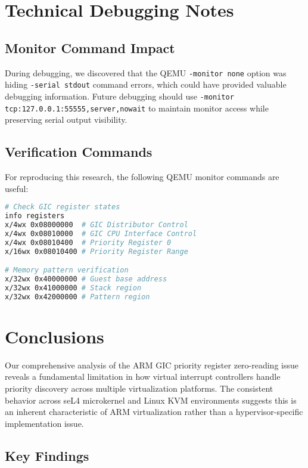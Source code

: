 \documentclass[12pt,a4paper]{article}
\begin{document}
\section{Technical Debugging Notes}

\subsection{Monitor Command Impact}

During debugging, we discovered that the QEMU \texttt{-monitor none} option was hiding \texttt{-serial stdout} command errors, which could have provided valuable debugging information. Future debugging should use \texttt{-monitor tcp:127.0.0.1:55555,server,nowait} to maintain monitor access while preserving serial output visibility.

\subsection{Verification Commands}

For reproducing this research, the following QEMU monitor commands are useful:

\begin{lstlisting}[language=bash,caption={QEMU Monitor Commands for GIC Analysis}]
# Check GIC register states
info registers
x/4wx 0x08000000  # GIC Distributor Control
x/4wx 0x08010000  # GIC CPU Interface Control  
x/4wx 0x08010400  # Priority Register 0
x/16wx 0x08010400 # Priority Register Range

# Memory pattern verification
x/32wx 0x40000000 # Guest base address
x/32wx 0x41000000 # Stack region
x/32wx 0x42000000 # Pattern region
\end{lstlisting}

\section{Conclusions}

Our comprehensive analysis of the ARM GIC priority register zero-reading issue reveals a fundamental limitation in how virtual interrupt controllers handle priority discovery across multiple virtualization platforms. The consistent behavior across seL4 microkernel and Linux KVM environments suggests this is an inherent characteristic of ARM virtualization rather than a hypervisor-specific implementation issue.

\subsection{Key Findings}
\end{document}
